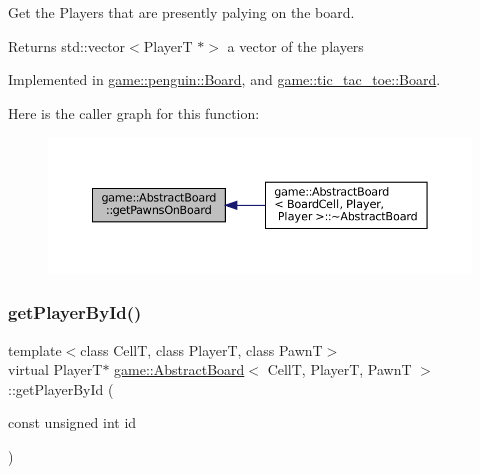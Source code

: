 Get the Players that are presently palying on the board. 

\begin{DoxyReturn}{Returns}
std\+::vector$<$\+Player\+T $\ast$$>$ a vector of the players 
\end{DoxyReturn}


Implemented in \hyperlink{classgame_1_1penguin_1_1_board_a13a38d7c935dd363d7ec9394488539ee}{game\+::penguin\+::\+Board}, and \hyperlink{classgame_1_1tic__tac__toe_1_1_board_a84cb90a6d844d80ecd5857fb4dc9ad1a}{game\+::tic\+\_\+tac\+\_\+toe\+::\+Board}.

Here is the caller graph for this function\+:
\nopagebreak
\begin{figure}[H]
\begin{center}
\leavevmode
\includegraphics[width=350pt]{classgame_1_1_abstract_board_a9c8a033b23ade01ecce24e95723ffd35_icgraph}
\end{center}
\end{figure}
\mbox{\label{classgame_1_1_abstract_board_a2ae30faf6d02d6d9757020a7ed7932cc}} 
\subsubsection{\texorpdfstring{get\+Player\+By\+Id()}{getPlayerById()}}
{\footnotesize\ttfamily template$<$class CellT, class PlayerT, class PawnT$>$ \\
virtual PlayerT$\ast$ \hyperlink{classgame_1_1_abstract_board}{game\+::\+Abstract\+Board}$<$ CellT, PlayerT, PawnT $>$\+::get\+Player\+By\+Id (\begin{DoxyParamCaption}\item[{const unsigned int}]{id }\end{DoxyParamCaption})\hspace{0.3cm}{\ttfamily [pure virtual]}}



